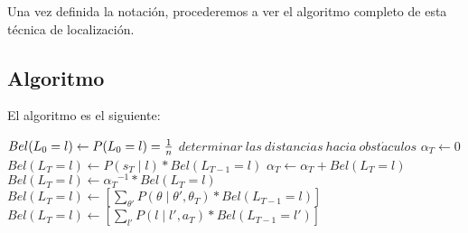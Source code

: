 Una vez definida la notación, procederemos a ver el algoritmo completo de esta técnica de localización.





\subsection{Algoritmo}

\noindent El algoritmo es el siguiente:\medskip

\begin{algorithmic}
   
    \State $Bel(L_0 = l)\gets P(L_0 = l) = {1 \over n}$
  \EndFor
    \State $determinar\ las\ distancias\ hacia\ obst\acute{a}culos$
  \EndFor
     
      \State $\alpha_T \gets 0$ 
        \State $Bel(L_T = l) \gets P(s_T \mid l)*Bel(L_{T-1} = l)$
        \State $\alpha_T \gets \alpha_T + Bel(L_T = l)$
      \EndFor
        \State $Bel(L_T = l) \gets {\alpha_T}^{-1} * Bel(L_T = l)$
      \EndFor
    \EndIf
          \State $Bel(L_T = l) \gets [\sum_{\theta'} P(\theta \mid \theta', \theta_T)*Bel(L_{T-1} = l)]$
        \EndFor
      \EndIf
          \State $Bel(L_T = l) \gets [\sum_{l'} P(l \mid l', a_T)*Bel(L_{T-1} = l')]$
        \EndFor
      \EndIf
    \EndIf
  \EndWhile
\end{algorithmic}

